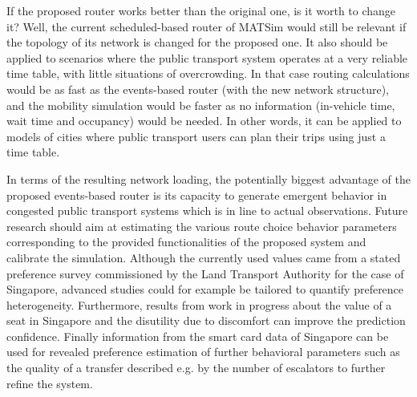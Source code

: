If the proposed router works better than the original one, is it worth to change it? Well, the current scheduled-based router of MATSim would still be relevant if the topology of its network is changed for the proposed one. It also should be applied to scenarios where the public transport system operates at a very reliable time table, with little situations of overcrowding. In that case routing calculations would be as fast as the events-based router (with the new network structure), and the mobility simulation would be faster as no information (in-vehicle time, wait time and occupancy) would be needed. In other words, it can be applied to models of cities where public transport users can plan their trips using just a time table.

In terms of the resulting network loading, the potentially biggest advantage of the proposed events-based router is its capacity to generate emergent behavior in congested public transport systems which is in line to actual observations. Future research should aim at estimating the various route choice behavior parameters corresponding to the provided functionalities of the proposed system and calibrate the simulation. Although the currently used values came from a stated preference survey commissioned by the Land Transport Authority for the case of Singapore, advanced studies could for example be tailored to quantify preference heterogeneity. Furthermore, results from work in progress about the value of a seat in Singapore and the disutility due to discomfort can improve the prediction confidence. Finally information from the smart card data of Singapore can be used for revealed preference estimation of further behavioral parameters such as the quality of a transfer described e.g. by the number of escalators to further refine the system.





